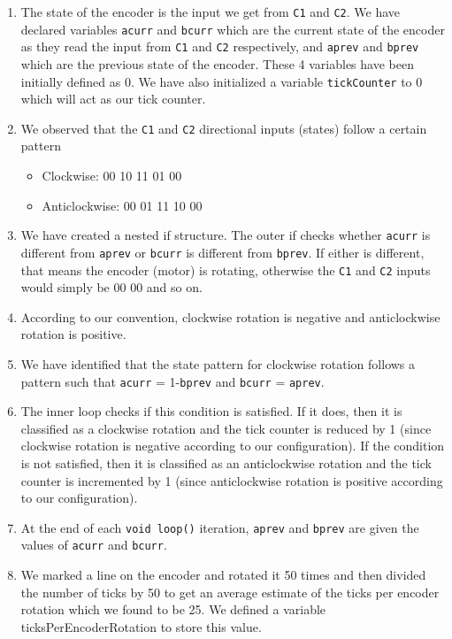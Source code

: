 \documentclass[12pt]{article}
\begin{document}
\begin{enumerate}
    \item The state of the encoder is the input we get from \texttt{\texttt{C1}} and \texttt{\texttt{C2}}. We have declared variables \texttt{acurr} and \texttt{bcurr} which are the current state of the encoder as they read the input from \texttt{\texttt{C1}} and \texttt{C2} respectively, and \texttt{aprev} and \texttt{bprev} which are the previous state of the encoder. These 4 variables have been initially defined as 0. We have also initialized a variable \texttt{tickCounter} to 0 which will act as our tick counter.
    \item We observed that the \texttt{C1} and \texttt{C2} directional inputs (states) follow a certain pattern
    \begin{itemize}
        \item Clockwise: 00 10 11 01 00
        \item Anticlockwise: 00 01 11 10 00
    \end{itemize}
    \item We have created a nested if structure. The outer if checks whether \texttt{acurr} is different from \texttt{aprev} or \texttt{bcurr} is different from \texttt{bprev}. If either is different, that means the encoder (motor) is rotating, otherwise the \texttt{C1} and \texttt{C2} inputs would simply be 00 00 and so on.
    \item According to our convention, clockwise rotation is negative and anticlockwise rotation is positive.
    \item We have identified that the state pattern for clockwise rotation follows a pattern such that \texttt{acurr} = 1-\texttt{bprev} and \texttt{bcurr} = \texttt{aprev}.
    \item The inner loop checks if this condition is satisfied. If it does, then it is classified as a clockwise rotation and the tick counter is reduced by 1 (since clockwise rotation is negative according to our configuration). If the condition is not satisfied, then it is classified as an anticlockwise rotation and the tick counter is incremented by 1 (since anticlockwise rotation is positive according to our configuration).
    \item At the end of each \texttt{void loop()} iteration, \texttt{aprev} and \texttt{bprev} are given the values of \texttt{acurr} and \texttt{bcurr}.
    \item We marked a line on the encoder and rotated it 50 times and then divided the number of ticks by 50 to get an average estimate of the ticks per encoder rotation which we found to be 25. We defined a variable ticksPerEncoderRotation to store this value.   

\end{enumerate}
\end{document}
